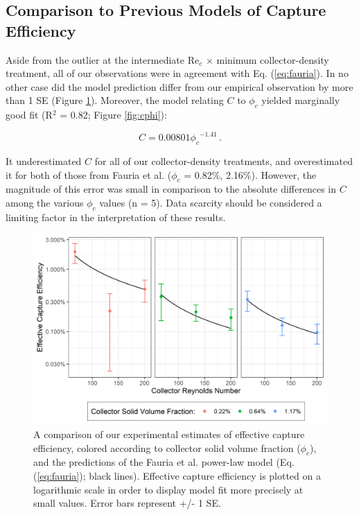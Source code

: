 \documentclass[geosciences,article,submit,moreauthors,pdftex]{Definitions/mdpi}
\newcommand\Rey{\mathrm{Re}}
\begin{document}
\subsection{Comparison to Previous Models of Capture Efficiency}

Aside from the outlier at the intermediate $\Rey_c$ $\times$ minimum collector-density treatment, all of our observations were in agreement with Eq. (\ref{eq:fauria}). In no other case did the model prediction differ from our empirical observation by more than 1 SE (Figure \ref{fig:compplot}). Moreover, the model relating $C$ to $\phi_c$ yielded marginally good fit (R$^2$ = 0.82; Figure \ref{fig:cphi}):

\begin{equation}
    C = 0.00801{\phi_c}^{-1.41}\,.
    \label{eq:cphi}
\end{equation}

\noindent It underestimated $C$ for all of our collector-density treatments, and overestimated it for both of those from Fauria et al. ($\phi_c$ = 0.82\%, 2.16\%). However, the magnitude of this error was small in comparison to the absolute differences in $C$ among the various $\phi_c$ values (n = 5). Data scarcity should be considered a limiting factor in the interpretation of these results.

\begin{figure}[H]
\centering
\includegraphics[width=5in]{../pics/comparisonplot.png}
\caption{A comparison of our experimental estimates of effective capture efficiency, colored according to collector solid volume fraction ($\phi_c$), and the predictions of the Fauria et al. \cite{Fauria_2015} power-law model (Eq. (\ref{eq:fauria}); black lines). Effective capture efficiency is plotted on a logarithmic scale in order to display model fit more precisely at small values. Error bars represent +/- 1 SE.}
\label{fig:compplot}
\end{figure}   
\end{document}
